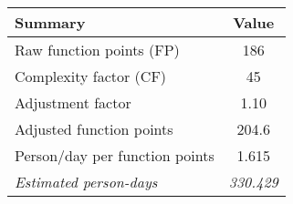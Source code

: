 \begin{tabular}{l|c}
\textbf{Summary} & \textbf{Value} \\ \hline
Raw function points (FP) & 186 \\
Complexity factor (CF) & 45 \\
Adjustment factor & 1.10 \\
Adjusted function points & 204.6 \\
Person/day per function points & 1.615 \\ \hline
\textit{Estimated person-days} & \textit{330.429}
\end{tabular}
